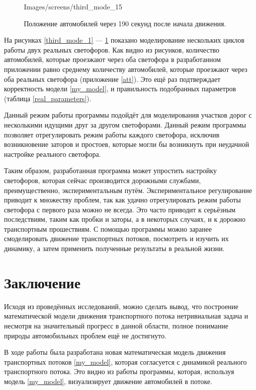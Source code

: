 \documentclass[12pt, a4paper]{extarticle}
\numberwithin{equation}{section}
\numberwithin{figure}{section}
\begin{document}
\begin{figure}[H]
\begin{center}
\begin{minipage}[h]{0.48\linewidth}
			{Images/screens/third_mode_15}
			\caption{Положение автомобилей через 190 секунд после начала движения.}
			\label{third_mode_15}
		\end{minipage}
	\end{center}
\end{figure}

На рисунках \ref{third_mode_1} --- \ref{third_mode_15} показано моделирование нескольких циклов работы двух реальных светофоров. Как видно из рисунков, количество автомобилей, которые проезжают через оба светофора в разработанном приложении равно среднему количеству автомобилей, которые проезжают через оба реальных светофора (приложение \ref{att}). Это ещё раз подтверждает корректность модели \eqref{my_model}, и правильность подобранных параметров (таблица \ref{real_parameters}).

Данный режим работы программы подойдёт для моделирования участков дорог с несколькими идущими друг за другом светофорами. Данный режим программы позволяет отрегулировать режим работы каждого светофора, исключив возникновение заторов и простоев, которые могли бы возникнуть при неудачной настройке реального светофора.  

Таким образом, разработанная программа может упростить настройку светофоров, которая сейчас производится дорожными службами, преимущественно, экспериментальным путём. Экспериментальное регулирование приводит к множеству проблем, так как удачно отрегулировать режим работы светофора с первого раза можно не всегда. Это часто приводит к серьёзным последствиям, таким как пробки и заторы, а в некоторых случаях, и к дорожно транспортным прошествиям. С помощью программы можно заранее смоделировать движение транспортных потоков, посмотреть и изучить их динамику, а затем применить полученные результаты в реальной жизни.

\section*{Заключение}
Исходя из проведённых исследований, можно сделать вывод, что построение математической модели  движения транспортного потока нетривиальная задача и несмотря на значительный прогресс в данной области, полное понимание природы автомобильных проблем ещё не достигнуто. 

В ходе работы была разработана новая математическая модель движения транспортных потоков \eqref{my_model}, которая согласуется с динамикой реального транспортного потока. Это видно из работы программы, которая, используя модель \eqref{my_model}, визуализирует движение автомобилей в потоке. 
\end{document}
